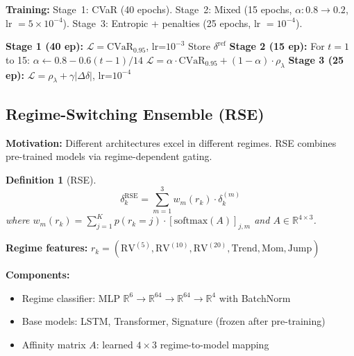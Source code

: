 \documentclass[11pt]{article}
\newtheorem{definition}[theorem]{Definition}
\newcommand{\R}{\mathbb{R}}
\newcommand{\cvar}{\mathrm{CVaR}}
\begin{document}
\textbf{Training:} Stage~1: CVaR (40 epochs). Stage~2: Mixed (15 epochs, $\alpha: 0.8 \to 0.2$, lr $= 5 \times 10^{-4}$). Stage~3: Entropic + penalties (25 epochs, lr $= 10^{-4}$).

\begin{algorithm}[t]
\caption{3SCH Training}
\label{alg:3sch}
\begin{algorithmic}[1]
\STATE \textbf{Stage 1 (40 ep):} $\mathcal{L} = \cvar_{0.95}$, lr=$10^{-3}$
\STATE Store $\delta^{\text{ref}}$
\STATE \textbf{Stage 2 (15 ep):} For $t = 1$ to 15:
\STATE \quad $\alpha \gets 0.8 - 0.6(t-1)/14$
\STATE \quad $\mathcal{L} = \alpha \cdot \cvar_{0.95} + (1-\alpha) \cdot \rho_\lambda$
\STATE \textbf{Stage 3 (25 ep):} $\mathcal{L} = \rho_\lambda + \gamma|\Delta\delta|$, lr=$10^{-4}$
\end{algorithmic}
\end{algorithm}

\subsection{Regime-Switching Ensemble (RSE)}

\textbf{Motivation:} Different architectures excel in different regimes. RSE combines pre-trained models via regime-dependent gating.

\begin{definition}[RSE]
\begin{equation}
    \delta_k^{\mathrm{RSE}} = \sum_{m=1}^{3} w_m(r_k) \cdot \delta_k^{(m)}
    \label{eq:rse}
\end{equation}
where $w_m(r_k) = \sum_{j=1}^K p(r_k\!=\!j) \cdot [\mathrm{softmax}(A)]_{j,m}$ and $A \in \R^{4 \times 3}$.
\end{definition}

\textbf{Regime features:} $r_k = (\mathrm{RV}^{(5)}, \mathrm{RV}^{(10)}, \mathrm{RV}^{(20)}, \mathrm{Trend}, \mathrm{Mom}, \mathrm{Jump})$

\textbf{Components:}
\begin{itemize}[noitemsep]
    \item Regime classifier: MLP $\R^6 \to \R^{64} \to \R^{64} \to \R^4$ with BatchNorm
    \item Base models: LSTM, Transformer, Signature (frozen after pre-training)
    \item Affinity matrix $A$: learned $4 \times 3$ regime-to-model mapping
\end{itemize}
\end{document}
